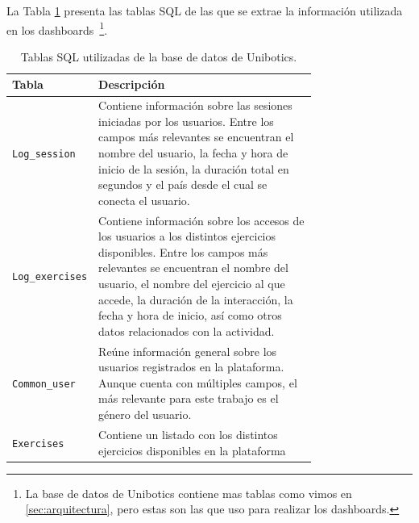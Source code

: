 \documentclass[a4paper, 12pt]{book}
\begin{document}
La Tabla \ref{tbl:sql-tables} presenta las tablas SQL de las que se extrae la información utilizada en los dashboards~\footnote{La base de datos de Unibotics contiene mas tablas como vimos en \ref{sec:arquitectura}, pero estas son las que uso para realizar los dashboards.}.

\begin{table}[!htb]
\centering
\caption{Tablas SQL utilizadas de la base de datos de Unibotics.}
\label{tbl:sql-tables}
\begin{tabular}{lp{0.75\linewidth}}
\toprule
\textbf{Tabla} & \textbf{Descripción} \\
\midrule
\texttt{Log\_session} & Contiene información sobre las sesiones iniciadas por los usuarios. Entre los campos más relevantes se encuentran el nombre del usuario, la fecha y hora de inicio de la sesión, la duración total en segundos y el país desde el cual se conecta el usuario. \\
\texttt{Log\_exercises} & Contiene información sobre los accesos de los usuarios a los distintos ejercicios disponibles. Entre los campos más relevantes se encuentran el nombre del usuario, el nombre del ejercicio al que accede, la duración de la interacción, la fecha y hora de inicio, así como otros datos relacionados con la actividad. \\
\texttt{Common\_user} & Reúne información general sobre los usuarios registrados en la plataforma. Aunque cuenta con múltiples campos, el más relevante para este trabajo es el género del usuario. \\
\texttt{Exercises} & Contiene un listado con los distintos ejercicios disponibles en la plataforma \\
\bottomrule
\end{tabular}
\vspace{1ex}

\end{table}
\end{document}
